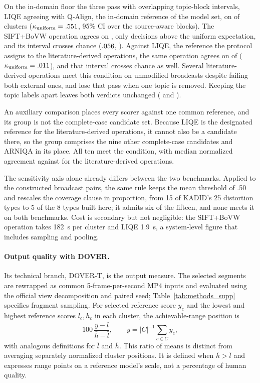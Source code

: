 \documentclass[sn-basic,Numbered]{sn-jnl}
\begin{document}
On the in-domain floor the three pass with overlapping topic-block intervals, LIQE
agreeing with Q-Align, the in-domain reference of the model set, on
\pisoLiqeAcertos{} of \pisoDe{} clusters ($\kappa_{\mathrm{uniform}}=.551{}$,
95\% CI \finLiqe{} over the \fusBlocos{} source-aware blocks). The SIFT+BoVW operation
agrees on \pisoSiftAcertos{}, only \pisoAcima{} decisions above the uniform expectation,
and its interval crosses chance ($.056{}$, \finSift{}).
Against LIQE, the reference the protocol assigns to the literature-derived
operations, the same operation agrees on \subResta{} of \pisoDe{}
($\kappa_{\mathrm{uniform}}=.011{}$), and that interval crosses chance as well. Several literature-derived operations meet this condition on unmodified broadcasts despite failing both external ones, and \pisoFrageis{} lose that pass when one topic is removed. Keeping the \senBlocos{} topic labels apart leaves both verdicts unchanged (\senLiqe{} and \senSift{}).

An auxiliary comparison places every scorer against one common reference, and its
group is not the complete-case candidate set. Because LIQE is the designated reference for
the literature-derived operations, it cannot also be a candidate there, so the group
comprises the nine other complete-case candidates and ARNIQA in its place. All ten meet
the condition, with median normalized agreement \pisoKapMod{} against \pisoKapOp{} for the
literature-derived operations.

The sensitivity axis alone already differs between the two benchmarks. Applied
to the constructed broadcast pairs, the same rule keeps the mean threshold of .50 and
rescales the coverage clause in proportion, from 15 of KADID's 25 distortion types to 5
of the 8 types built here; it admits six of the fifteen, and none meets it on
both benchmarks.  Cost is
secondary but not negligible: the SIFT+BoVW operation takes 182~s per cluster and LIQE
1.9~s, a system-level figure that includes sampling and pooling.

\paragraph{Output quality with DOVER.} Its technical branch, DOVER-T, is the output measure.
The selected segments are rewrapped as common 5-frame-per-second MP4 inputs and evaluated
using the official view decomposition and paired seed; Table~\ref{tab:methods_supp} specifies fragment sampling.
For selected reference score $y_c$ and the lowest and highest reference scores $l_c,h_c$ in each cluster, the achievable-range position is
\begin{equation}
100\,\frac{\bar y-\bar l}{\bar h-\bar l},\qquad
\bar y=|C|^{-1}\sum_{c\in C}y_c,
\label{eq:sup_globalrange}
\end{equation}
with analogous definitions for $\bar l$ and $\bar h$. This ratio of means is distinct from averaging separately normalized cluster positions. It is defined when $\bar h>\bar l$ and expresses range points on a reference model's scale, not a percentage of human quality.
\end{document}
